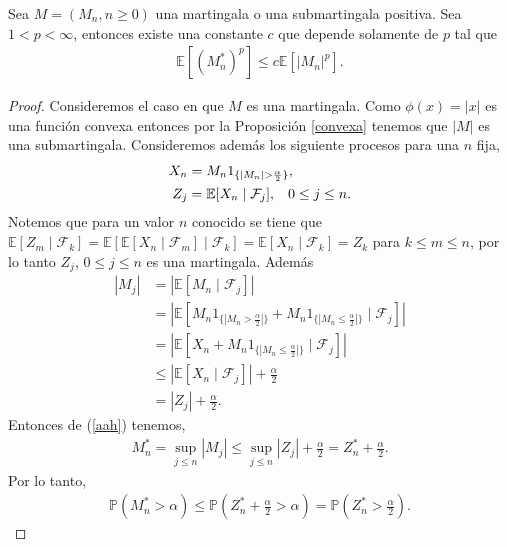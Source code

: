 \begin{theorem}
\label{lp}
	Sea $M = (M_n, n \geq 0)$ una martingala o una submartingala positiva. Sea $1 < p < \infty$, entonces existe una constante $c$ que depende solamente de $p$ tal que
	\begin{align*}
		\mathbb{E}[(M_n^{*})^p] \leq c\mathbb{E}[|M_n|^p].
	\end{align*}
\end{theorem}
\begin{proof}
	Consideremos el caso en que $M$ es una martingala. Como $\phi(x) = |x|$ es una función convexa entonces por la Proposición \ref{convexa} tenemos que $|M|$ es una submartingala. Consideremos además los siguiente procesos para una $n$ fija,
	\begin{align*}
		X_n & = M_n1_{\{|M_n| > \frac{\alpha}{2} \} }, \\
		Z_j & = \mathbb{E}[X_n \mid \mathcal{F}_j], \hspace{0.3cm} 0 \leq j \leq n.
	\end{align*}
	Notemos que para un valor $n$ conocido se tiene que $\mathbb{E}[Z_m \mid \mathcal{F}_k] = \mathbb{E}[\mathbb{E}[X_n \mid \mathcal{F}_m] \mid \mathcal{F}_k] = \mathbb{E}[X_n \mid \mathcal{F}_k] = Z_k$ para $k \leq m \leq n$, por lo tanto $Z_j$, $0 \leq j \leq n$ es una martingala. Además
	\begin{align}
		|M_j| & = |\mathbb{E}[M_n \mid \mathcal{F}_j]| \nonumber \\
		& = \left|\mathbb{E}\left[ M_n 1_{\{|M_n > \frac{\alpha}{2}|\}} + M_n 1_{\{|M_n \leq \frac{\alpha}{2}|\}} \mid \mathcal{F}_j \right] \right| \nonumber \\
		& = \left| \mathbb{E}\left[X_n + M_n 1_{\{|M_n \leq \frac{\alpha}{2}|\}} \mid \mathcal{F}_j \right] \right| \nonumber \\
		& \leq \left| \mathbb{E}\left[ X_n \mid \mathcal{F}_j \right] \right| + \frac{\alpha}{2} \nonumber \\
		& = |Z_j| + \frac{\alpha}{2}. \label{aah}
	\end{align}
	Entonces de (\ref{aah}) tenemos, 
	\begin{align*}
		M_n^{*} = \sup_{j \leq n} |M_j| \leq \sup_{j \leq n} |Z_j| + \frac{\alpha}{2} = Z_n^{*} + \frac{\alpha}{2}.
	\end{align*}
	Por lo tanto, 
	\begin{align}
		\mathbb{P}(M_n^{*} > \alpha) \leq \mathbb{P}(Z_n^{*} + \frac{\alpha}{2} > \alpha) =  \mathbb{P}(Z_n^{*} > \frac{\alpha}{2}). \label{aai}

\end{align}
\end{proof}

